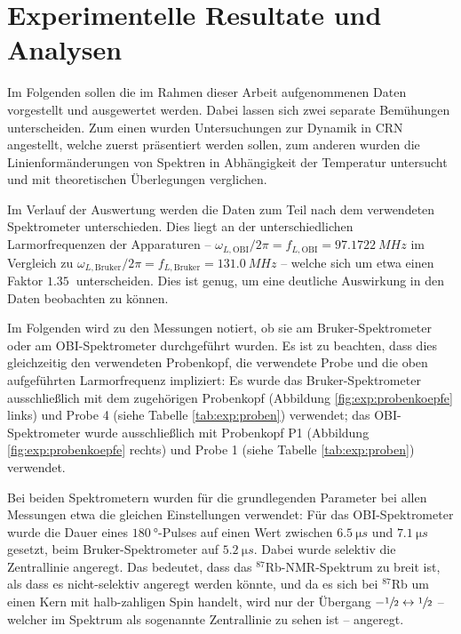 \chapter{Experimentelle Resultate und Analysen}
\label{chapter:experiment}

Im Folgenden sollen die im Rahmen dieser Arbeit aufgenommenen Daten vorgestellt und ausgewertet werden. Dabei lassen sich zwei separate Bemühungen unterscheiden. Zum einen wurden Untersuchungen zur Dynamik in CRN angestellt, welche zuerst präsentiert werden sollen, zum anderen wurden die Linienformänderungen von Spektren in Abhängigkeit der Temperatur untersucht und mit theoretischen Überlegungen verglichen.

Im Verlauf der Auswertung werden die Daten zum Teil nach dem verwendeten Spektrometer unterschieden. Dies liegt an der unterschiedlichen Larmorfrequenzen der Apparaturen -- $\omega_{L, \text{OBI}} / 2\pi = f_{L, \text{OBI}} = \SI{97.1722}{MHz}$ im Vergleich zu $\omega_{L, \text{Bruker}} / 2\pi = f_{L, \text{Bruker}} = \SI{131.0}{MHz}$ -- welche sich um etwa einen Faktor $\SI{1.35}{}$ unterscheiden. Dies ist genug, um eine deutliche Auswirkung in den Daten beobachten zu können.

Im Folgenden wird zu den Messungen notiert, ob sie am Bruker-Spektrometer oder am OBI-Spektrometer durchgeführt wurden. Es ist zu beachten, dass dies gleichzeitig den verwendeten Probenkopf, die verwendete Probe und die oben aufgeführten Larmorfrequenz impliziert: Es wurde das Bruker-Spektrometer ausschließlich mit dem zugehörigen Probenkopf (Abbildung \ref{fig:exp:probenkoepfe} links) und Probe 4 (siehe Tabelle \ref{tab:exp:proben}) verwendet; das OBI-Spektrometer wurde ausschließlich mit Probenkopf P1 (Abbildung \ref{fig:exp:probenkoepfe} rechts) und Probe 1 (siehe Tabelle \ref{tab:exp:proben}) verwendet.

Bei beiden Spektrometern wurden für die grundlegenden Parameter bei allen Messungen etwa die gleichen Einstellungen verwendet: Für das OBI-Spektrometer wurde die Dauer eines $\SI{180}{\degree}$-Pulses auf einen Wert zwischen $\SI{6.5}{\micro s}$ und $\SI{7.1}{\micro s}$ gesetzt, beim Bruker-Spektrometer auf $\SI{5.2}{\micro s}$. Dabei wurde selektiv die Zentrallinie angeregt. Das bedeutet, dass das $^\text{87}$Rb-NMR-Spektrum zu breit ist, als dass es nicht-selektiv angeregt werden könnte, und da es sich bei $^\text{87}$Rb um einen Kern mit halb-zahligen Spin handelt, wird nur der Übergang $-\sfrac{1}{2} \leftrightarrow \sfrac{1}{2}$ -- welcher im Spektrum als sogenannte Zentrallinie zu sehen ist -- angeregt.

